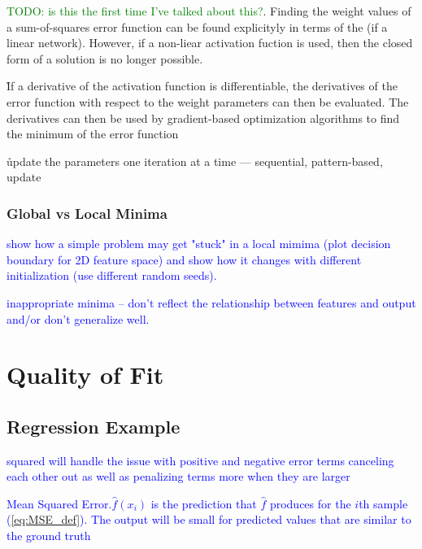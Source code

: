 \r{\textcolor{green}{TODO: is this the first time I've talked about this?}. Finding the weight values of a sum-of-squares error function can be found explicityly in terms of the  (if a linear network). However, if a non-liear activation fuction is used, then the closed form of a solution is no longer possible.}

\r{If a derivative of the activation function is differentiable, the derivatives of the error function with respect to the weight parameters can then be evaluated. The derivatives can then be used by gradient-based optimization algorithms to find the minimum of the error function }

\r{update the parameters one iteration at a time --- sequential, pattern-based, update}


\subsubsection{Global vs Local Minima}

\textcolor{blue}{show how a simple problem may get "stuck" in a local mimima (plot decision boundary for 2D feature space) and show how it changes with different initialization (use different random seeds). }

\textcolor{blue}{{inappropriate minima} -- don't reflect the relationship between features and output and/or don't generalize well.}

\section{Quality of Fit}


\subsection{Regression Example}


\textcolor{blue}{squared will handle the issue with positive and negative error terms canceling each other out as well as penalizing terms more when they are larger}

\textcolor{blue}{Mean Squared Error.$\hat{f}(x_i)$ is the prediction that $\hat{f}$ produces for the $i$th sample (\ref{eq:MSE_def}). The output will be small for predicted values that are similar to the ground truth}

